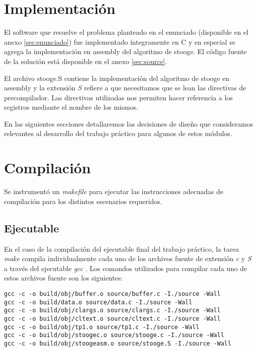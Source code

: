 \documentclass[a4paper,11pt]{article}
\begin{document}
\section{Implementación}

El software que resuelve el problema planteado en el enunciado (disponible en
el anexo \ref{sec:enunciado}) fue implementado íntegramente en C y en especial
se agrega la implementación en assembly del algoritmo de stooge. El código
fuente de la solución está disponible en el anexo \ref{sec:source}.

El archivo stooge.S contiene la implementación del algoritmo de stooge en assembly
y la extensión \textit{S} refiere a que necesitamos que se lean las directivas
de precompilador.
Las directivas utilizadas nos permiten hacer referencia a los registros mediante
el nombre de los mismos.

En las siguientes secciones detallaremos las decisiones de diseño que
consideramos relevantes al desarrollo del trabajo práctico para algunos de
estos módulos.

\section{Compilación}

Se instrumentó un \textit{makefile} \cite{WIKIMAKE} para ejecutar las
instrucciones adecuadas de compilación para los distintos escenarios
requeridos.

\subsection{Ejecutable}

En el caso de la compilación del ejecutable final del trabajo práctico, la
tarea \textit{make} compila individualmente cada uno de los archivos fuente de
extensión \textit{c} y \textit{S} a través del ejecutable \textit{gcc} \cite{WIKIGCC}.
Los comandos utilizados para compilar cada uno de estos archivos fuente son los
siguientes:

\begin{lstlisting}
gcc -c -o build/obj/buffer.o source/buffer.c -I./source -Wall
gcc -c -o build/data.o source/data.c -I./source -Wall
gcc -c -o build/obj/clargs.o source/clargs.c -I./source -Wall
gcc -c -o build/obj/cltext.o source/cltext.c -I./source -Wall
gcc -c -o build/obj/tp1.o source/tp1.c -I./source -Wall
gcc -c -o build/obj/stoogec.o source/stooge.c -I./source -Wall
gcc -c -o build/obj/stoogeasm.o source/stooge.S -I./source -Wall
\end{lstlisting}
\end{document}
